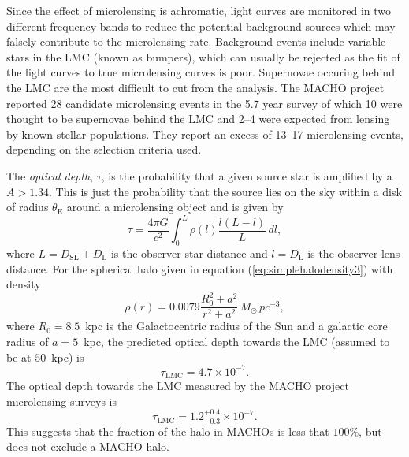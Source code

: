 Since the effect of microlensing is achromatic, light curves are monitored in
two different frequency bands to reduce the potential background sources
which may falsely contribute to the microlensing rate. Background events
include variable stars in the LMC (known as bumpers\cite{1996astro.ph..6165A}), 
which can usually be rejected as the fit of the light curves to true
microlensing curves is poor. Supernovae occuring behind the LMC are the most
difficult to cut from the analysis. The MACHO project reported 28 candidate
microlensing events in the 5.7 year survey of which 10 were thought to be
supernovae behind the LMC and 2--4 were expected from lensing by known stellar
populations.  They report an excess of 13--17 microlensing events, depending
on the selection criteria used.

The \emph{optical depth}, $\tau$, is the probability that a given source star
is amplified by a $A > 1.34$\cite{Paczynski:1985jf}. This is just the
probability that the source lies on the sky within a disk of radius
$\theta_\mathrm{E}$ around a microlensing object and is given
by\cite{Alcock:1995zx}
\begin{equation}
\tau = \frac{4\pi G}{c^2} \int_0^{L} \rho(l) \frac{l(L - l)}{L}\,dl,
\end{equation}
where $L = D_\mathrm{SL} + D_\mathrm{L}$ is the observer-star distance and $l
= D_\mathrm{L}$ is the observer-lens distance. For the spherical halo given in
equation (\ref{eq:simplehalodensity3}) with density
\begin{equation}
\rho(r) = 0.0079 \frac{R_0^2 + a^2}{r^2 + a^2} \,M_\odot\, pc^{-3},
\end{equation}
where $R_0 = 8.5$~kpc is the Galactocentric radius of the Sun and a galactic
core radius of $a = 5$~kpc, the predicted optical depth towards the LMC
(assumed to be at $50$~kpc) is\cite{Alcock:1995zx}
\begin{equation}
\tau_\mathrm{LMC} = 4.7 \times 10^{-7}.
\end{equation}
The optical depth towards the LMC measured by the MACHO project microlensing
surveys is
\begin{equation}
\tau_\mathrm{LMC} = 1.2_{-0.3}^{+0.4} \times 10^{-7}.
\end{equation}
This suggests that the fraction of the halo in MACHOs is less that $100\%$,
but does not exclude a MACHO halo.

